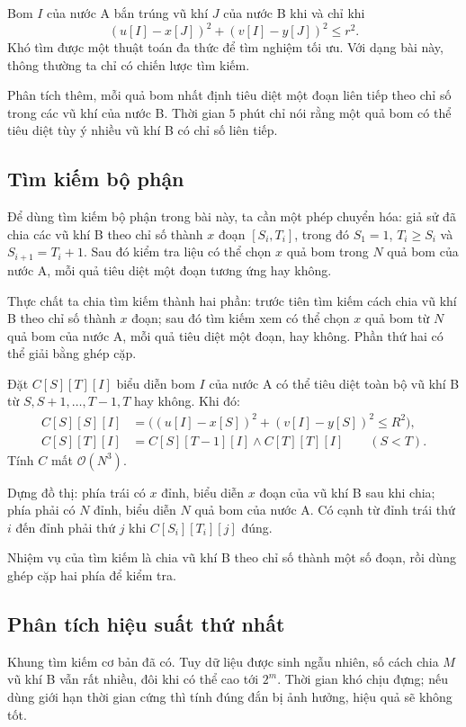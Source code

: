 \documentclass[11pt]{article}
\newcommand{\Oh}{\mathcal{O}}
\begin{document}
Bom $I$ của nước A bắn trúng vũ khí $J$ của nước B khi và chỉ khi
\[
  (u[I]-x[J])^2+(v[I]-y[J])^2\le r^2.
\]
Khó tìm được một thuật toán đa thức để tìm nghiệm tối ưu. Với dạng bài này,
thông thường ta chỉ có chiến lược tìm kiếm.

Phân tích thêm, mỗi quả bom nhất định tiêu diệt một đoạn liên tiếp theo chỉ
số trong các vũ khí của nước B. Thời gian $5$ phút chỉ nói rằng một quả bom có
thể tiêu diệt tùy ý nhiều vũ khí B có chỉ số liên tiếp.

\subsection{Tìm kiếm bộ phận}

Để dùng tìm kiếm bộ phận trong bài này, ta cần một phép chuyển hóa: giả sử đã
chia các vũ khí B theo chỉ số thành $x$ đoạn $[S_i,T_i]$, trong đó
$S_1=1$, $T_i\ge S_i$ và $S_{i+1}=T_i+1$. Sau đó kiểm tra liệu có thể chọn
$x$ quả bom trong $N$ quả bom của nước A, mỗi quả tiêu diệt một đoạn tương
ứng hay không.

Thực chất ta chia tìm kiếm thành hai phần: trước tiên tìm kiếm cách chia vũ
khí B theo chỉ số thành $x$ đoạn; sau đó tìm kiếm xem có thể chọn $x$ quả bom
từ $N$ quả bom của nước A, mỗi quả tiêu diệt một đoạn, hay không. Phần thứ hai
có thể giải bằng ghép cặp.

Đặt $C[S][T][I]$ biểu diễn bom $I$ của nước A có thể tiêu diệt toàn bộ vũ khí
B từ $S,S+1,\ldots,T-1,T$ hay không. Khi đó:
\[
\begin{aligned}
  C[S][S][I] &=
    \bigl((u[I]-x[S])^2+(v[I]-y[S])^2\le R^2\bigr),\\
  C[S][T][I] &= C[S][T-1][I]\land C[T][T][I]\qquad(S<T).
\end{aligned}
\]
Tính $C$ mất $\Oh(N^3)$.

Dựng đồ thị: phía trái có $x$ đỉnh, biểu diễn $x$ đoạn của vũ khí B sau khi
chia; phía phải có $N$ đỉnh, biểu diễn $N$ quả bom của nước A. Có cạnh từ đỉnh
trái thứ $i$ đến đỉnh phải thứ $j$ khi $C[S_i][T_i][j]$ đúng.

Nhiệm vụ của tìm kiếm là chia vũ khí B theo chỉ số thành một số đoạn, rồi dùng
ghép cặp hai phía để kiểm tra.

\subsection{Phân tích hiệu suất thứ nhất}

Khung tìm kiếm cơ bản đã có. Tuy dữ liệu được sinh ngẫu nhiên, số cách chia
$M$ vũ khí B vẫn rất nhiều, đôi khi có thể cao tới $2^m$. Thời gian khó chịu
đựng; nếu dùng giới hạn thời gian cứng thì tính đúng đắn bị ảnh hưởng, hiệu
quả sẽ không tốt.
\end{document}
